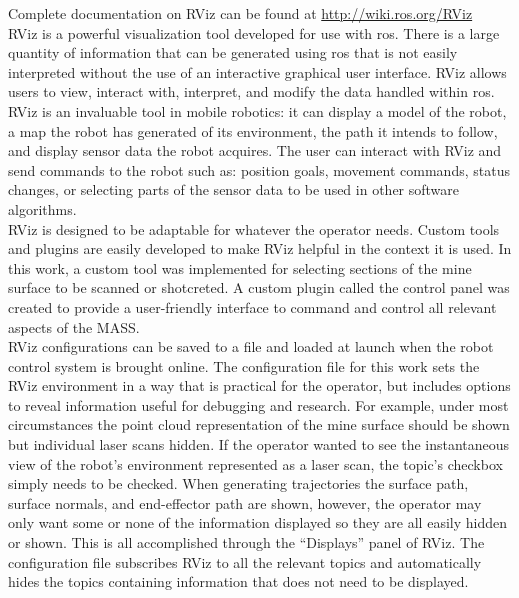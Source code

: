Complete documentation on RViz can be found at \url{http://wiki.ros.org/RViz}\\

RViz is a powerful visualization tool developed for use with \acrshort{ros}. There is a large quantity of information that can be generated using \acrshort{ros} that is not easily interpreted without the use of an interactive graphical user interface. RViz allows users to view, interact with, interpret, and modify the data handled within \acrshort{ros}. RViz is an invaluable tool in mobile robotics: it can display a model of the robot, a map the robot has generated of its environment, the path it intends to follow, and display sensor data the robot acquires. The user can interact with RViz and send commands to the robot such as: position goals, movement commands, status changes, or selecting parts of the sensor data to be used in other software algorithms.\\

RViz is designed to be adaptable for whatever the operator needs. Custom tools and plugins are easily developed to make RViz helpful in the context it is used. In this work, a custom tool was implemented for selecting sections of the mine surface to be scanned or shotcreted. A custom plugin called the control panel was created to provide a user-friendly interface to command and control all relevant aspects of the MASS.\\

RViz configurations can be saved to a file and loaded at launch when the robot control system is brought online. The configuration file for this work sets the RViz environment in a way that is practical for the operator, but includes options to reveal information useful for debugging and research. For example, under most circumstances the point cloud representation of the mine surface should be shown but individual laser scans hidden. If the operator wanted to see the instantaneous view of the robot's environment represented as a laser scan, the topic's checkbox simply needs to be checked. When generating trajectories the surface path, surface normals, and end-effector path are shown, however, the operator may only want some or none of the information displayed so they are all easily hidden or shown. This is all accomplished through the ``Displays'' panel of RViz. The configuration file subscribes RViz to all the relevant topics and automatically hides the topics containing information that does not need to be displayed.\\

